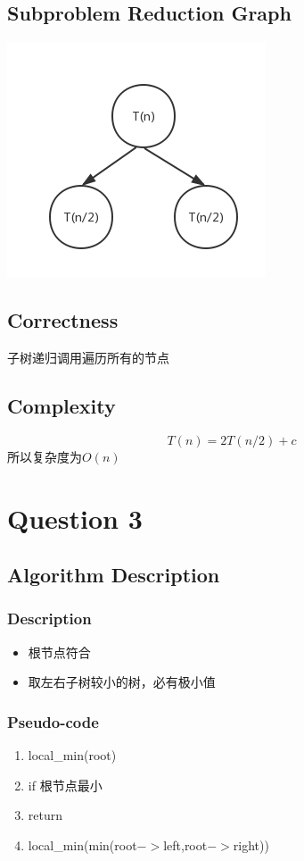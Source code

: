 \documentclass{article}
\begin{document}
\subsection{Subproblem Reduction Graph}
  \centerline{\includegraphics[scale=0.6]{q2.png}}
\subsection{Correctness}
子树递归调用遍历所有的节点
\subsection{Complexity}
  $$ T(n) = 2T(n/2) + c $$
  所以复杂度为$O(n)$
\section{Question 3}
\subsection{Algorithm Description}
  \subsubsection{Description}
  \begin{itemize}
    \item 根节点符合
    \item 取左右子树较小的树，必有极小值
    \end{itemize}
  \subsubsection{Pseudo-code}
  \begin{enumerate}[1:]
    \item local_min(root)
    \item if 根节点最小
    \item return
    \item local_min(min(root$->$left,root$->$right))
  \end{enumerate}
\end{document}
